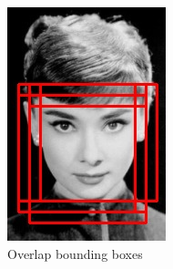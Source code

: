 \begin{figure}[!h]
	\centering
	\begin{subfigure}{.13\linewidth}
		\includegraphics[width=0.9\linewidth]{images/detection/img1_noNMS}
		\caption{Overlap bounding boxes }
		\label{fig:sub_noNMS}
	\end{subfigure}
	\begin{subfigure}{.13\linewidth}

\end{subfigure}
\end{figure}
